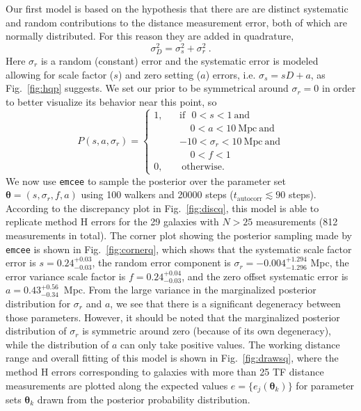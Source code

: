 \documentclass[a4paper,fleqn,usenatbib]{mnras}
\begin{document}
Our first model is based on the hypothesis that there are are distinct systematic and random contributions to the distance measurement error, both of which are normally distributed. For this reason they are added in quadrature, 
\begin{equation}
\sigma_D^2=\sigma_s^2+\sigma_r^2\ .
	\label{eq:bayq}
\end{equation}
Here $\sigma_r$ is a random (constant) error and the systematic error is modeled allowing for scale factor ($s$) and zero setting ($a$) errors, i.e.  $\sigma_s=sD+a$, as Fig.~\ref{fig:hqp} suggests.  We set our prior to be symmetrical around $\sigma_r=0$ in order to better visualize its behavior near this point, so
\begin{equation}
P(s,a,\sigma_r)=\left\{
\begin{aligned}
1,\ \ \ \ &\mathrm{if}\ \ \ 0<s<1\ \mathrm{and}\\
& \ \ \ \ \  0<a<10\ \mathrm{Mpc}\ \mathrm{and}\\
&-10<\sigma_r<10\ \mathrm{Mpc}\ \mathrm{and}\\
& \ \ \ \ \  0<f<1\\
0,\ \ \ \ &\ \mathrm{otherwise.}
\end{aligned}
\right.
	\label{eq:priorq}
\end{equation}
We now use \texttt{emcee} to sample the posterior over the parameter set $\pmb{\theta}=(s,\sigma_r,f,a)$ using 100 walkers and 20000 steps ($t_\mathrm{autocorr} \lesssim 90$ steps). According to the discrepancy plot in Fig.~\ref{fig:discq}, this model is able to replicate method H errors for the 29 galaxies with $N>25$ measurements (812 measurements in total). The corner plot showing the posterior sampling made by \texttt{emcee} is shown in Fig.~\ref{fig:cornerq}, which shows that the systematic scale factor error is $s=0.24_{-0.03}^{+0.03}$, the random error component is $\sigma_r=-0.004_{-1.296}^{+1.294}$ Mpc, the error variance scale factor is $f=0.24_{-0.03}^{+0.04}$, and the zero offset systematic error is $a=0.43_{-0.34}^{+0.56}$\ Mpc. From the large variance in the marginalized posterior distribution for $\sigma_r$ and $a$, we see that there is a significant degeneracy between those parameters. However, it should be noted that the marginalized posterior distribution of $\sigma_r$ is symmetric around zero (because of its own degeneracy), while the distribution of $a$ can only take positive values. The working distance range and overall fitting of this model is shown in Fig.~\ref{fig:drawsq}, where the method H errors corresponding to galaxies with more than 25 TF distance measurements are plotted along the expected values $e=\{e_j(\pmb{\theta}_k)\}$ for parameter sets $\pmb{\theta}_k$ drawn from the posterior probability distribution. 
\end{document}
